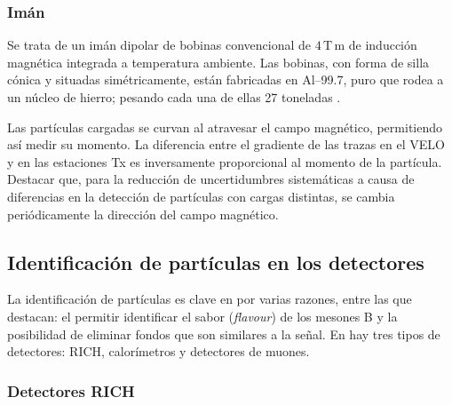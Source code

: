 \subsubsection{Imán} %

Se trata de un imán dipolar de bobinas convencional de $4 \, \mathrm{T\,m}$ de inducción magnética integrada a temperatura ambiente. Las bobinas, con forma de silla cónica y situadas simétricamente, están fabricadas en Al--99.7, puro que rodea a un núcleo de hierro; pesando cada una de ellas 27 toneladas \cite{Alves:1129809}.

Las partículas cargadas se curvan al atravesar el campo magnético, permitiendo así medir su momento. La diferencia entre el gradiente de las trazas en el VELO y en las estaciones Tx es inversamente proporcional al momento de la partícula. 
Destacar que, para la reducción de uncertidumbres sistemáticas a causa de diferencias en la detección de partículas con cargas distintas, \color{norm} se cambia periódicamente la dirección del campo magnético.



\subsection{Identificación de partículas en los detectores} %

La identificación de partículas es clave en \lhcb por varias razones, entre las que destacan: el permitir identificar el sabor (\emph{flavour}) de los mesones B y la posibilidad de eliminar \color{vero} fondos \color{norm} que son similares a la señal. En \lhcb hay tres tipos de detectores: RICH, calorímetros y detectores de muones.




\subsubsection{Detectores RICH} %

